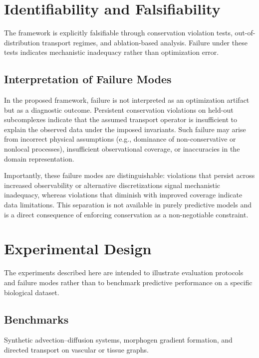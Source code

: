 \documentclass[10pt,article]{article}
\begin{document}
\section{Identifiability and Falsifiability}

The framework is explicitly falsifiable through conservation violation tests, out-of-distribution transport regimes, and ablation-based analysis. Failure under these tests indicates mechanistic inadequacy rather than optimization error.


\subsection{Interpretation of Failure Modes}

In the proposed framework, failure is not interpreted as an optimization artifact but as a diagnostic outcome. Persistent conservation violations on held-out subcomplexes indicate that the assumed transport operator is insufficient to explain the observed data under the imposed invariants. Such failure may arise from incorrect physical assumptions (e.g., dominance of non-conservative or nonlocal processes), insufficient observational coverage, or inaccuracies in the domain representation.

Importantly, these failure modes are distinguishable: violations that persist across increased observability or alternative discretizations signal mechanistic inadequacy, whereas violations that diminish with improved coverage indicate data limitations. This separation is not available in purely predictive models and is a direct consequence of enforcing conservation as a non-negotiable constraint.
\section{Experimental Design}
The experiments described here are intended to illustrate evaluation protocols and failure modes rather than to benchmark predictive performance on a specific biological dataset.

\subsection{Benchmarks}
Synthetic advection--diffusion systems, morphogen gradient formation, and directed transport on vascular or tissue graphs.
\end{document}
